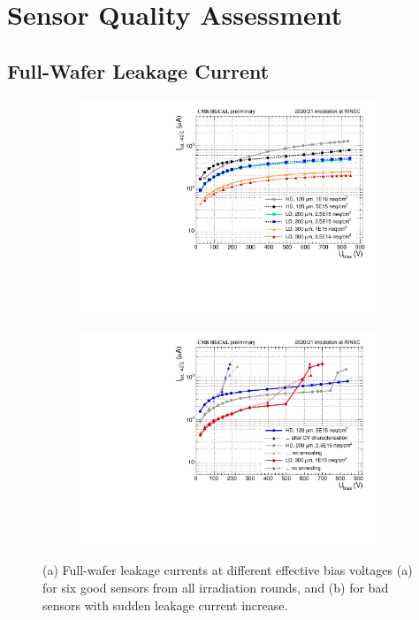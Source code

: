 \section{Sensor Quality Assessment}
\label{sec:QA}

\subsection{Full-Wafer Leakage Current}
\label{subsec:QA_Itot}

\begin{figure}
	\captionsetup[subfigure]{aboveskip=-1pt,belowskip=-1pt}
	\centering
	\begin{subfigure}[b]{0.49\textwidth}
		\includegraphics[width=0.999\textwidth]{plots/total_iv/total_current_IV.pdf}
		\subcaption{
		}
		\label{plot:tot_IV_good}
	\end{subfigure}
	\hfill
	\begin{subfigure}[b]{0.49\textwidth}
		\includegraphics[width=0.999\textwidth]{plots/total_iv/total_current_IV_bad.pdf}
		\subcaption{
		}
		\label{plot:tot_IV_bad}
	\end{subfigure}
	\caption{
		(a) Full-wafer leakage currents at different effective bias voltages (a) for six good sensors from all irradiation rounds, and (b) for bad sensors with sudden leakage current increase.
	}
\end{figure}


